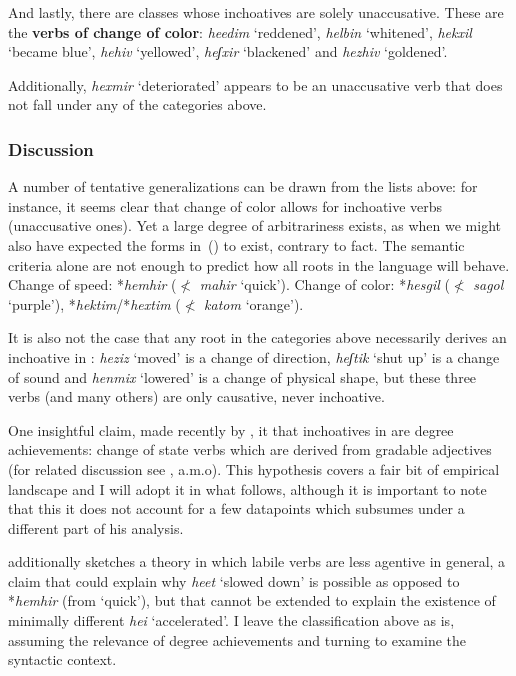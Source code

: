 And lastly, there are classes whose inchoatives are solely unaccusative. These are the \textbf{verbs of change of color}: \emph{heedim} `reddened', \emph{helbin} `whitened', \emph{hekxil} `became blue', \emph{he{\texttslig}hiv} `yellowed', \emph{heʃxir} `blackened' and \emph{hezhiv} `goldened'. %

Additionally, \emph{hexmir} `deteriorated' appears to be an unaccusative verb that does not fall under any of the categories above.

		\subsubsection{Discussion}
A number of tentative generalizations can be drawn from the lists above: for instance, it seems clear that change of color allows for inchoative verbs (unaccusative ones). Yet a large degree of arbitrariness exists, as when we might also have expected the forms in~(\nextx) to exist, contrary to fact. The semantic criteria alone are not enough to predict how all roots in the language will behave.
\pex
	\a Change of speed:
		*\emph{hemhir} ($\nless$ \emph{mahir} `quick').
	\a Change of color:
		*\emph{hesgil} ($\nless$ \emph{sagol} `purple'), *\emph{hektim}/*\emph{hextim} ($\nless$ \emph{katom} `orange').
\xe

It is also not the case that any root in the categories above necessarily derives an inchoative in {\thif}: \emph{heziz} `moved' is a change of direction, \emph{heʃtik} `shut up' is a change of sound and \emph{henmix} `lowered' is a change of physical shape, but these three verbs (and many others) are only causative, never inchoative.

One insightful claim, made recently by \cite{lev16}, it that inchoatives in {\thif} are degree achievements: change of state verbs which are derived from gradable adjectives (for related discussion see \citealt{dowty91,hayetal99,rotsteinwinter04,kennedylevin08,bobaljik12}, a.m.o). This hypothesis covers a fair bit of empirical landscape and I will adopt it in what follows, although it is important to note that this it does not account for a few datapoints which \cite{lev16} subsumes under a different part of his analysis. 

\cite{lev16} additionally sketches a theory in which labile verbs are less agentive in general, a claim that could explain why \emph{heet} `slowed down' is possible as opposed to *\emph{hemhir} (from `quick'), but that cannot be extended to explain the existence of minimally different \emph{hei{\texttslig}} `accelerated'. I leave the classification above as is, assuming the relevance of degree achievements and turning to examine the syntactic context.

